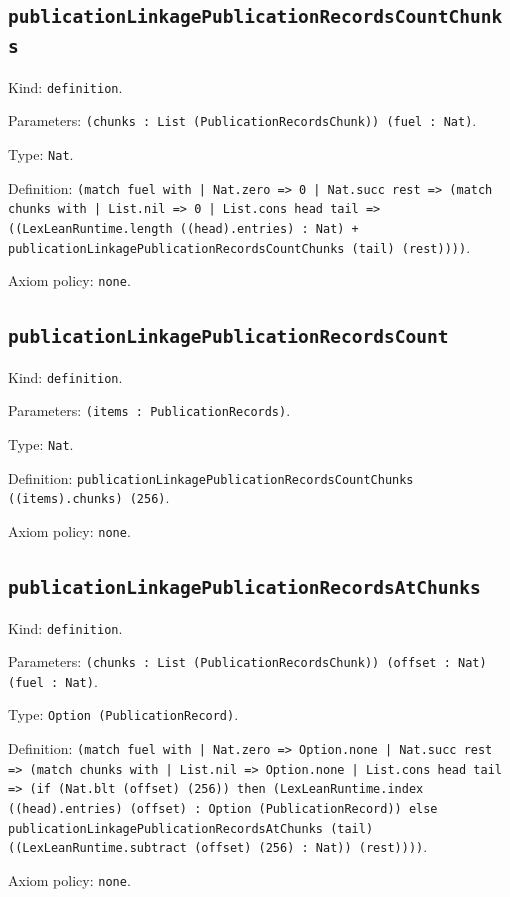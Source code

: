 \documentclass[11pt]{article}
\begin{document}
\subsection*{\texttt{publicationLinkagePublicationRecordsCountChunks}}
\noindent Kind: \texttt{definition}.\par
\noindent Parameters: \texttt{(chunks : List (PublicationRecordsChunk)) (fuel : Nat)}.\par
\noindent Type: \texttt{Nat}.\par
\noindent Definition: \texttt{(match fuel with | Nat.zero => 0 | Nat.succ rest => (match chunks with | List.nil => 0 | List.cons head tail => ((LexLeanRuntime.length ((head).entries) : Nat) + publicationLinkagePublicationRecordsCountChunks (tail) (rest))))}.\par
\noindent Axiom policy: \texttt{none}.\par
\subsection*{\texttt{publicationLinkagePublicationRecordsCount}}
\noindent Kind: \texttt{definition}.\par
\noindent Parameters: \texttt{(items : PublicationRecords)}.\par
\noindent Type: \texttt{Nat}.\par
\noindent Definition: \texttt{publicationLinkagePublicationRecordsCountChunks ((items).chunks) (256)}.\par
\noindent Axiom policy: \texttt{none}.\par
\subsection*{\texttt{publicationLinkagePublicationRecordsAtChunks}}
\noindent Kind: \texttt{definition}.\par
\noindent Parameters: \texttt{(chunks : List (PublicationRecordsChunk)) (offset : Nat) (fuel : Nat)}.\par
\noindent Type: \texttt{Option (PublicationRecord)}.\par
\noindent Definition: \texttt{(match fuel with | Nat.zero => Option.none | Nat.succ rest => (match chunks with | List.nil => Option.none | List.cons head tail => (if (Nat.blt (offset) (256)) then (LexLeanRuntime.index ((head).entries) (offset) : Option (PublicationRecord)) else publicationLinkagePublicationRecordsAtChunks (tail) ((LexLeanRuntime.subtract (offset) (256) : Nat)) (rest))))}.\par
\noindent Axiom policy: \texttt{none}.\par
\end{document}
